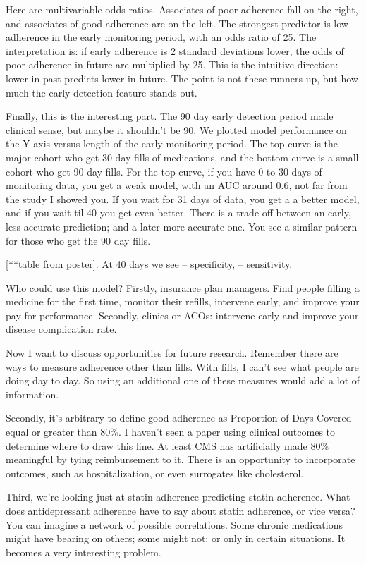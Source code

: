 \documentclass[12pt]{report}
\begin{document}
\begin{large}
Here are multivariable odds ratios. Associates of poor adherence fall
on the right, and associates of good adherence are on the left. The
strongest predictor is low adherence in the early monitoring period,
with an odds ratio of 25. The interpretation is: if early adherence is
2 standard deviations lower, the odds of poor adherence in future are
multiplied by 25. This is the intuitive direction: lower in past
predicts lower in future. The point is not these runners up, but how
much the early detection feature stands out.

Finally, this is the interesting part. The 90 day early detection
period made clinical sense, but maybe it shouldn't be 90. We plotted
model performance on the Y axis versus length of the early monitoring
period. The top curve is the major cohort who get 30 day fills of
medications, and the bottom curve is a small cohort who get 90 day
fills. For the top curve, if you have 0 to 30 days of monitoring data,
you get a weak model, with an AUC around 0.6, not far from the study I
showed you. If you wait for 31 days of data, you get a a better model,
and if you wait til 40 you get even better. There is a trade-off
between an early, less accurate prediction; and a later more accurate
one. You see a similar pattern for those who get the 90 day fills.

[**table from poster]. At 40 days we see -- specificity, --
sensitivity.

Who could use this model? Firstly, insurance plan managers. Find
people filling a medicine for the first time, monitor their refills,
intervene early, and improve your pay-for-performance. Secondly,
clinics or ACOs: intervene early and improve your disease complication
rate.

Now I want to discuss opportunities for future research. Remember
there are ways to measure adherence other than fills. With fills, I
can't see what people are doing day to day. So using an additional one
of these measures would add a lot of information.

Secondly, it's arbitrary to define good adherence as Proportion of
Days Covered equal or greater than 80\%. I haven't seen a paper using
clinical outcomes to determine where to draw this line. At least CMS
has artificially made 80\% meaningful by tying reimbursement to it.
There is an opportunity to incorporate outcomes, such as
hospitalization, or even surrogates like cholesterol.

Third, we're looking just at statin adherence predicting statin
adherence. What does antidepressant adherence have to say about statin
adherence, or vice versa? You can imagine a network of possible
correlations. Some chronic medications might have bearing on others;
some might not; or only in certain situations. It becomes a very
interesting problem.


\end{large}
\end{document}
